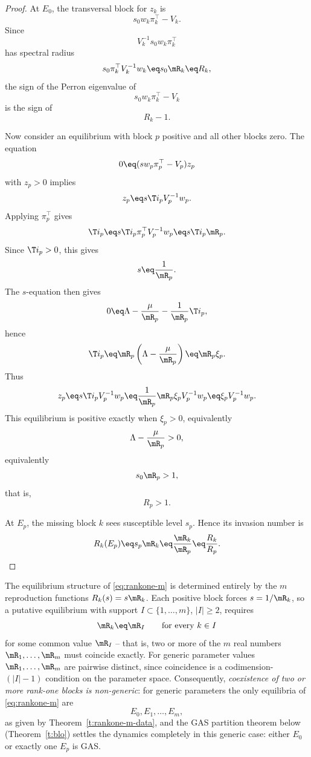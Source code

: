 \begin{proof}
At $E_0$, the transversal block for $z_k$ is
\[
s_0w_k\pi_k^\top-V_k.
\]
Since
\[
V_k^{-1}s_0w_k\pi_k^\top
\]
has spectral radius
\[
s_0\pi_k^\top V_k^{-1}w_k
\eq
s_0\mR_k
\eq
R_k,
\]
the sign of the Perron eigenvalue of
\[
s_0w_k\pi_k^\top-V_k
\]
is the sign of
\[
R_k-1.
\]

Now consider an equilibrium with block $p$ positive and all other blocks
zero. The equation
\[
0
\eq
(sw_p\pi_p^\top-V_p)z_p
\]
with $z_p>0$ implies
\[
z_p
\eq
s\T i_pV_p^{-1}w_p.
\]
Applying $\pi_p^\top$ gives
\[
\T i_p
\eq
s\T i_p\pi_p^\top V_p^{-1}w_p
\eq
s\T i_p\mR_p.
\]
Since $\T i_p>0$, this gives
\[
s
\eq
\frac1{\mR_p}.
\]
The $s$-equation then gives
\[
0
\eq
\Lambda-\frac{\mu}{\mR_p}-\frac1{\mR_p}\T i_p,
\]
hence
\[
\T i_p
\eq
\mR_p\left(\Lambda-\frac{\mu}{\mR_p}\right)
\eq
\mR_p\xi_p.
\]
Thus
\[
z_p
\eq
s\T i_pV_p^{-1}w_p
\eq
\frac1{\mR_p}\mR_p\xi_pV_p^{-1}w_p
\eq
\xi_pV_p^{-1}w_p.
\]
This equilibrium is positive exactly when $\xi_p>0$, equivalently
\[
\Lambda-\frac{\mu}{\mR_p}>0,
\]
equivalently
\[
s_0\mR_p>1,
\]
that is,
\[
R_p>1.
\]

At $E_p$, the missing block $k$ sees susceptible level $s_p$. Hence its
invasion number is
\[
R_k(E_p)
\eq
s_p\mR_k
\eq
\frac{\mR_k}{\mR_p}
\eq
\frac{R_k}{R_p}.
\]
\end{proof}


The equilibrium structure of \eqref{eq:rankone-m} is determined
entirely by the $m$ reproduction functions $R_k(s)=s\mR_k$.  Each
positive block forces $s=1/\mR_k$, so a putative equilibrium with
support $I\subset\{1,\ldots,m\}$, $|I|\ge2$, requires
\[
\mR_k\eq\mR_I
\qquad\text{for every }k\in I
\]
for some common value $\mR_I$ -- that is, two or more of the $m$ real
numbers $\mR_1,\ldots,\mR_m$ must coincide exactly.  For generic
parameter values $\mR_1,\ldots,\mR_m$ are pairwise distinct, since
coincidence is a codimension-$(|I|-1)$ condition on the parameter
space.  Consequently, \emph{coexistence of two or more rank-one
blocks is non-generic}: for generic parameters the only equilibria of
\eqref{eq:rankone-m} are
\[
E_0,E_1,\ldots,E_m,
\]
as given by Theorem~\ref{t:rankone-m-data}, and the GAS partition
theorem below (Theorem~\ref{t:blo}) settles the dynamics
completely in this generic case: either $E_0$ or exactly one $E_p$ is
GAS.

